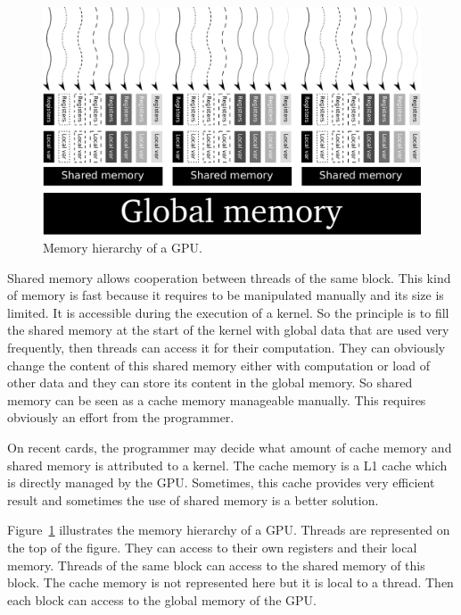 \begin{figure}[hbtp!]
\centerline{\includegraphics[scale=0.60]{Chapters/chapter1/figures/memory_hierarchy.pdf}}
\caption{Memory hierarchy of a GPU.}
\label{ch1:fig:memory_hierarchy}
\end{figure}



Shared memory allows  cooperation between threads of the  same block.  This kind
of memory is fast because it requires to be manipulated manually and its size is
limited.  It is accessible during the execution of a kernel. So the principle is
to fill the shared  memory at the start of the kernel  with global data that are
used very  frequently, then threads can  access it for  their computation.  They
can obviously change  the content of this shared  memory either with computation
or load of  other data and they can  store its content in the  global memory. So
shared memory can  be seen as a cache memory  manageable manually. This requires
obviously an effort from the programmer.

On  recent cards,  the programmer  may decide  what amount  of cache  memory and
shared memory is attributed to a kernel. The cache memory is a L1 cache which is
directly  managed by  the GPU.  Sometimes,  this cache  provides very  efficient
result and sometimes the use of shared memory is a better solution.




Figure~\ref{ch1:fig:memory_hierarchy}  illustrates  the  memory hierarchy  of  a
GPU. Threads are represented on the top  of the figure. They can access to their
own registers  and their local memory. Threads  of the same block  can access to
the shared memory of this block. The cache memory is not represented here but it
is local  to a thread. Then  each block can access  to the global  memory of the
GPU.

